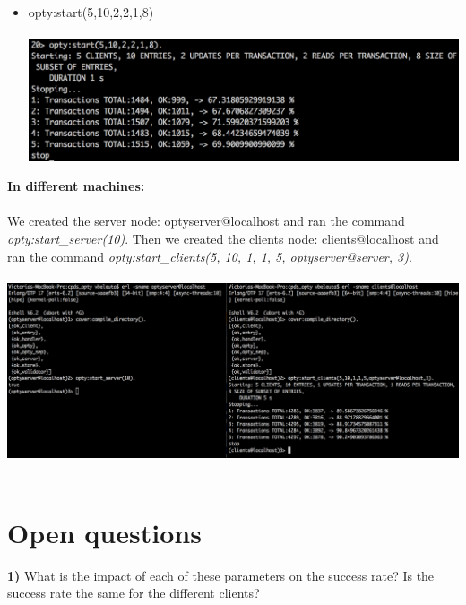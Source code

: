 \documentclass[a4paper, 11pt]{article}
\begin{document}
\begin{itemize}
\item opty:start(5,10,2,2,1,8)\\\\
\includegraphics[scale=0.5]{images/exp-v-5.png} \\
\end{itemize}


\textbf{In different machines:}\\\\

We created the server node: optyserver@localhost and ran the command \textit{opty:start\_server(10)}. Then we created the clients node: clients@localhost and ran the command \textit{opty:start\_clients(5, 10, 1, 1, 5, optyserver@server, 3)}.\\\\
\includegraphics[scale=0.29]{images/distributed.png} \\\\

\newpage
\section{Open questions}

\textbf{1)} What is the impact of each of these parameters on the success rate? Is the success rate the same for the different clients?\\
\end{document}

